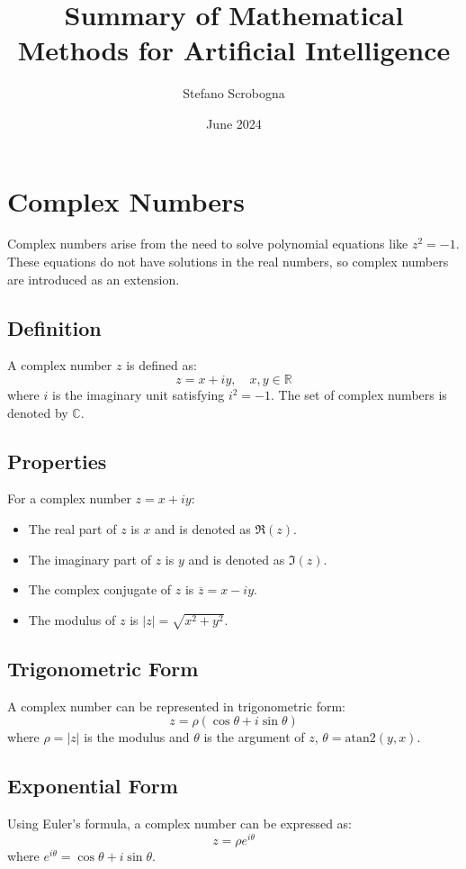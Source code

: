 \documentclass{article}
\title{Summary of Mathematical Methods for Artificial Intelligence}
\author{Stefano Scrobogna}
\date{June 2024}
\begin{document}
\maketitle

\section{Complex Numbers}
Complex numbers arise from the need to solve polynomial equations like \(z^2 = -1\). These equations do not have solutions in the real numbers, so complex numbers are introduced as an extension.

\subsection{Definition}
A complex number \(z\) is defined as:
\[
z = x + iy, \quad x, y \in \mathbb{R}
\]
where \(i\) is the imaginary unit satisfying \(i^2 = -1\). The set of complex numbers is denoted by \(\mathbb{C}\).

\subsection{Properties}
For a complex number \(z = x + iy\):
\begin{itemize}
    \item The real part of \(z\) is \(x\) and is denoted as \(\Re(z)\).
    \item The imaginary part of \(z\) is \(y\) and is denoted as \(\Im(z)\).
    \item The complex conjugate of \(z\) is \(\overline{z} = x - iy\).
    \item The modulus of \(z\) is \(|z| = \sqrt{x^2 + y^2}\).
\end{itemize}

\subsection{Trigonometric Form}
A complex number can be represented in trigonometric form:
\[
z = \rho (\cos \theta + i \sin \theta)
\]
where \(\rho = |z|\) is the modulus and \(\theta\) is the argument of \(z\), \(\theta = \text{atan2}(y, x)\).

\subsection{Exponential Form}
Using Euler's formula, a complex number can be expressed as:
\[
z = \rho e^{i\theta}
\]
where \(e^{i\theta} = \cos \theta + i \sin \theta\).
\end{document}
